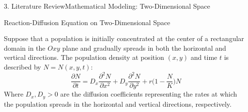 \documentclass[10pt]{beamer}
\begin{document}
    \begin{frame}{3. Literature Review}{Mathematical Modeling: Two-Dimensional Space}
      \begin{center}
        \begin{block}{Reaction-Diffusion Equation on Two-Dimensional Space}
            \begin{minipage}{\textwidth}
              Suppose that a population is initially concentrated at the center of a rectangular domain in the $Oxy$ plane and gradually spreads in both the horizontal and vertical directions. The population density at position $(x,y)$ and time $t$ is described by $N = N(x,y,t)$:
              $$
              \dfrac{\partial N}{\partial t} = D_x\dfrac{\partial^2 N}{\partial x^2} + D_y\dfrac{\partial^2 N}{\partial y^2} + r\Big(1-\dfrac{N}{K}\Big)N
              $$
              Where $D_x, D_y > 0$ are the diffusion coefficients representing the rates at which the population spreads in the horizontal and vertical directions, respectively.
            \end{minipage}
        \end{block}
      \end{center}
    \end{frame}
\end{document}
